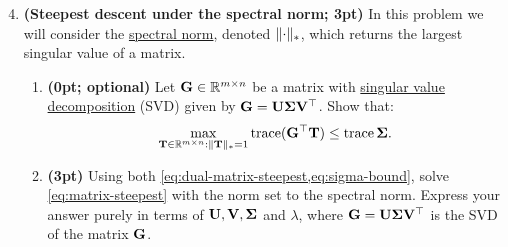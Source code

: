 \documentclass[12pt,letterpaper]{article}
\begin{document}
\begin{enumerate}
\setcounter{enumi}{3}

    \item \label{item:spectral} \textbf{(Steepest descent under the spectral norm; 3pt)} In this problem we will consider the \href{https://en.wikipedia.org/wiki/Matrix_norm#Spectral_norm_(p_=_2)}{spectral norm}, denoted $\Vert {\cdot} \Vert_*$, 
    which returns the largest singular value of a matrix.

    \begin{enumerate}
        \item \textbf{(0pt; optional)} Let ${\mathbf{G}} \in\mathbb{R}^{m\times n}$ be a matrix with \href{https://en.wikipedia.org/wiki/Singular_value_decomposition}{singular value decomposition} (SVD) given by ${\mathbf{G}} = {\mathbf{U}} {\bm{\Sigma}} {\mathbf{V}}^\top$. Show that:
        \begin{equation}\label{eq:sigma-bound}
            \max_{{\mathbf{T}} \in \mathbb{R}^{m \times n} : \Vert {{\mathbf{T}}} \Vert_* = 1} \operatorname{trace}({\mathbf{G}}^\top {\mathbf{T}}) \leq \operatorname{trace}{{\bm{\Sigma}}}.
        \end{equation}

            
        
        \item \textbf{(3pt)} Using both \cref{eq:dual-matrix-steepest,eq:sigma-bound}, solve \cref{eq:matrix-steepest} with the norm set to the spectral norm. Express your answer purely in terms of ${\mathbf{U}},{\mathbf{V}},{\bm{\Sigma}}$ and $\lambda$, where ${\mathbf{G}} = {\mathbf{U}} {\bm{\Sigma}} {\mathbf{V}}^\top$ is the SVD of the matrix ${\mathbf{G}}$.
        
        
    \end{enumerate}
\end{enumerate}
\end{document}
